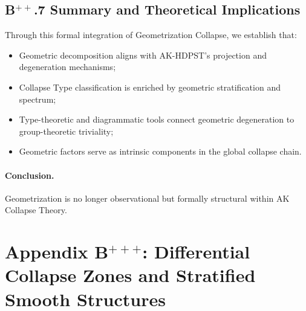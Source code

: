 \documentclass[11pt]{article}
\begin{document}

\subsection*{B$^{++}$.7 Summary and Theoretical Implications}

Through this formal integration of Geometrization Collapse, we establish that:

\begin{itemize}
    \item Geometric decomposition aligns with AK-HDPST's projection and degeneration mechanisms;
    \item Collapse Type classification is enriched by geometric stratification and spectrum;
    \item Type-theoretic and diagrammatic tools connect geometric degeneration to group-theoretic triviality;
    \item Geometric factors serve as intrinsic components in the global collapse chain.
\end{itemize}

\paragraph{Conclusion.} Geometrization is no longer observational but formally structural within AK Collapse Theory.





\section*{Appendix B$^{+++}$: Differential Collapse Zones and Stratified Smooth Structures}
\end{document}

